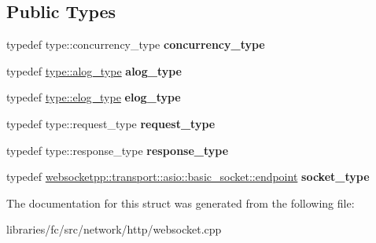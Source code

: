 \subsection*{Public Types}
\begin{DoxyCompactItemize}
\item 
\mbox{\label{structfc_1_1http_1_1detail_1_1asio__with__stub__log_1_1transport__config_a76b2e8c2ca69bb715f5eb1e4e6935eef}} 
typedef type\+::concurrency\+\_\+type {\bfseries concurrency\+\_\+type}
\item 
\mbox{\label{structfc_1_1http_1_1detail_1_1asio__with__stub__log_1_1transport__config_ad6a0e14beb9573c012122832cd065f8d}} 
typedef \mbox{\hyperlink{classwebsocketpp_1_1log_1_1stub}{type\+::alog\+\_\+type}} {\bfseries alog\+\_\+type}
\item 
\mbox{\label{structfc_1_1http_1_1detail_1_1asio__with__stub__log_1_1transport__config_a83a40c233142f9d98d7e3e8b6d128347}} 
typedef \mbox{\hyperlink{structfc_1_1http_1_1detail_1_1asio__with__stub__log_a5be4919ddde517477acb81e13cc3826d}{type\+::elog\+\_\+type}} {\bfseries elog\+\_\+type}
\item 
\mbox{\label{structfc_1_1http_1_1detail_1_1asio__with__stub__log_1_1transport__config_a1c05fbe9e231de82ecc62c53f6dabed7}} 
typedef type\+::request\+\_\+type {\bfseries request\+\_\+type}
\item 
\mbox{\label{structfc_1_1http_1_1detail_1_1asio__with__stub__log_1_1transport__config_a972244bd6afd404ad7236a65a5345396}} 
typedef type\+::response\+\_\+type {\bfseries response\+\_\+type}
\item 
\mbox{\label{structfc_1_1http_1_1detail_1_1asio__with__stub__log_1_1transport__config_a0a8f4f1fa6acd33291ef557113ee6806}} 
typedef \mbox{\hyperlink{classwebsocketpp_1_1transport_1_1asio_1_1basic__socket_1_1endpoint}{websocketpp\+::transport\+::asio\+::basic\+\_\+socket\+::endpoint}} {\bfseries socket\+\_\+type}
\end{DoxyCompactItemize}


The documentation for this struct was generated from the following file\+:\begin{DoxyCompactItemize}
\item 
libraries/fc/src/network/http/websocket.\+cpp\end{DoxyCompactItemize}
